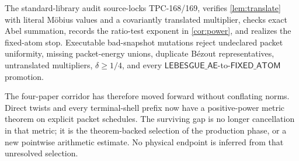 \documentclass[11pt]{article}
\theoremstyle{definition}
\begin{document}
The standard-library audit source-locks TPC-168/169, verifies
\cref{lem:translate} with literal M\"obius values and a covariantly
translated multiplier, checks exact Abel summation, records the
ratio-test exponent in \cref{cor:power}, and realizes the fixed-atom
stop.  Executable bad-snapshot mutations reject undeclared packet
uniformity, missing packet-energy unions, duplicate B\'ezout
representatives, untranslated multipliers, \(\delta\ge1/4\), and every
\(\mathsf{LEBESGUE\_AE}\)-to-\(\mathsf{FIXED\_ATOM}\) promotion.

The four-paper corridor has therefore moved forward without
conflating norms.  Direct twists and every terminal-shell prefix now
have a positive-power metric theorem on explicit packet schedules.
The surviving gap is no longer cancellation in that metric; it is
the theorem-backed selection of the production phase, or a new
pointwise arithmetic estimate.  No physical endpoint is inferred
from that unresolved selection.



\end{document}
